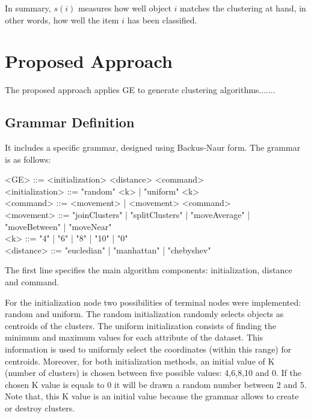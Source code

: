 \documentclass[journal]{IEEEtran}
\begin{document}
	In summary, $s(i)$ measures how well object $i$ matches the clustering at hand, in other words, how well the item $i$ has been classified.
	



	
\section{Proposed Approach} \label{sec:methodology}


The proposed approach applies GE to generate clustering algorithms.......


\subsection{ Grammar Definition}

It includes a specific grammar, designed  using  Backus-Naur form. The grammar is as follows:




	\begin{grammar}
		<GE> ::= <initialization> <distance> <command> 
		\\ <initialization> ::= "random" <k> | "uniform" <k>
		\\ <command> ::= <movement> | <movement> <command>
		\\ <movement> ::= "joinClusters" | "splitClusters" | "moveAverage" | "moveBetween" | "moveNear" 
		\\ <k> ::= "4" | "6" | "8" | "10" | "0"
		\\ <distance> ::= "eucledian" | "manhattan" | "chebyshev"
		\label{ge-clustering-grammar}
	\end{grammar}
	
	
	The first line specifies the main algorithm components: initialization, distance and command. 
	
	For the initialization node two possibilities of terminal nodes were implemented: random and uniform. The random initialization randomly selects  objects as centroids of the clusters. The uniform initialization consists of finding the minimum and maximum values for each attribute of the dataset. This information is used to uniformly select the coordinates (within this range) for centroids. Moreover, for both initialization methods, an initial value of K (number of clusters) is chosen between five possible values: 4,6,8,10 and 0. If the chosen K value is equals to 0 it will be drawn a random number between 2 and 5. Note that, this K value is an initial value because the grammar allows to create or destroy clusters. 
	
\end{document}
